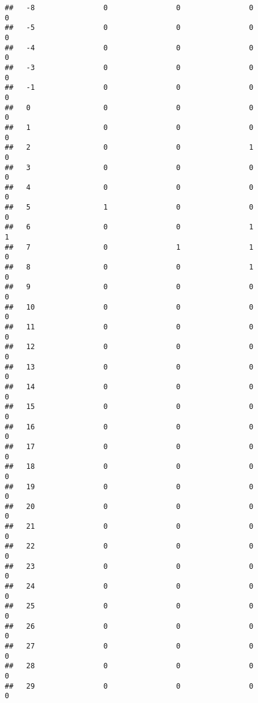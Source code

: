 \documentclass[]{article}
\begin{document}
\begin{verbatim}
##   -8                0                0                0                0
##   -5                0                0                0                0
##   -4                0                0                0                0
##   -3                0                0                0                0
##   -1                0                0                0                0
##   0                 0                0                0                0
##   1                 0                0                0                0
##   2                 0                0                1                0
##   3                 0                0                0                0
##   4                 0                0                0                0
##   5                 1                0                0                0
##   6                 0                0                1                1
##   7                 0                1                1                0
##   8                 0                0                1                0
##   9                 0                0                0                0
##   10                0                0                0                0
##   11                0                0                0                0
##   12                0                0                0                0
##   13                0                0                0                0
##   14                0                0                0                0
##   15                0                0                0                0
##   16                0                0                0                0
##   17                0                0                0                0
##   18                0                0                0                0
##   19                0                0                0                0
##   20                0                0                0                0
##   21                0                0                0                0
##   22                0                0                0                0
##   23                0                0                0                0
##   24                0                0                0                0
##   25                0                0                0                0
##   26                0                0                0                0
##   27                0                0                0                0
##   28                0                0                0                0
##   29                0                0                0                0

\end{verbatim}
\end{document}
